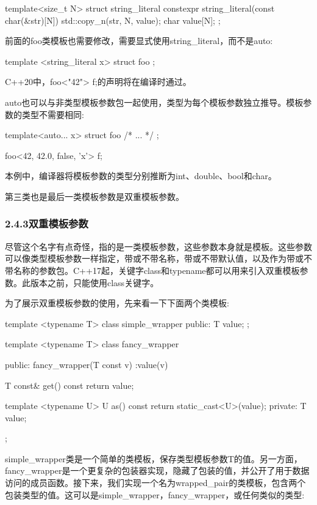 \begin{cpp}
template<size_t N>
struct string_literal
{
	constexpr string_literal(const char(&str)[N])
	{
		std::copy_n(str, N, value);
	}
	char value[N];
};
\end{cpp}

前面的foo类模板也需要修改，需要显式使用string\_literal，而不是auto:

\begin{cpp}
template <string_literal x>
struct foo
{
};
\end{cpp}

C++20中，foo<"42"> f;的声明将在编译时通过。

auto也可以与非类型模板参数包一起使用，类型为每个模板参数独立推导。模板参数的类型不需要相同:

\begin{cpp}
template<auto... x>
struct foo
{ /* ... */ };

foo<42, 42.0, false, 'x'> f;
\end{cpp}

本例中，编译器将模板参数的类型分别推断为int、double、bool和char。

第三类也是最后一类模板参数是双重模板参数。

\subsubsection{2.4.3\hspace{0.2cm}双重模板参数}

尽管这个名字有点奇怪，指的是一类模板参数，这些参数本身就是模板。这些参数可以像类型模板参数一样指定，带或不带名称，带或不带默认值，以及作为带或不带名称的参数包。C++17起，关键字class和typename都可以用来引入双重模板参数。此版本之前，只能使用class关键字。

为了展示双重模板参数的使用，先来看一下下面两个类模板:

\begin{cpp}
template <typename T>
class simple_wrapper
{
public:
	T value;
};

template <typename T>
class fancy_wrapper
{
public:
	fancy_wrapper(T const v) :value(v)
	{
	}

	T const& get() const { return value; }
	
	template <typename U>
	U as() const
	{
		return static_cast<U>(value);
	}
private:
	T value;
};
\end{cpp}

simple\_wrapper类是一个简单的类模板，保存类型模板参数T的值。另一方面，fancy\_wrapper是一个更复杂的包装器实现，隐藏了包装的值，并公开了用于数据访问的成员函数。接下来，我们实现一个名为wrapped\_pair的类模板，包含两个包装类型的值。这可以是simple\_wrapper，fancy\_wrapper，或任何类似的类型:


